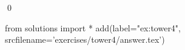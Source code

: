 
\begin{ex} 
  \label{ex:tower4}
  
  \qed
\end{ex} 
\begin{python0}
from solutions import *
add(label="ex:tower4",
    srcfilename='exercises/tower4/answer.tex') 
\end{python0}
